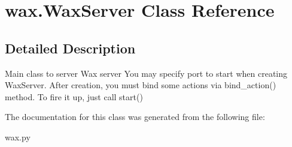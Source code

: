 \hypertarget{classwax_1_1WaxServer}{}\section{wax.\+Wax\+Server Class Reference}
\label{classwax_1_1WaxServer}


\subsection{Detailed Description}
\begin{DoxyVerb}Main class to server Wax server
You may specify port to start when creating WaxServer.
After creation, you must bind some actions via bind_action() method.
To fire it up, just call start()
\end{DoxyVerb}
 

The documentation for this class was generated from the following file\+:\begin{DoxyCompactItemize}
\item 
wax.\+py\end{DoxyCompactItemize}
